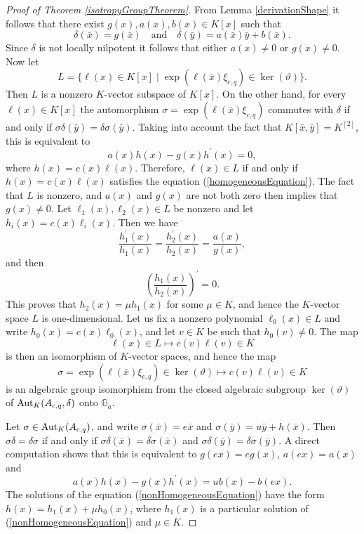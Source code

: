 \documentclass{article}
\newcommand \G {\mathbb{G}}
\renewcommand \a {A}
\renewcommand \k {K}
\newcommand \auto {{\rm Aut}}
\begin{document}
{\begin{proof}[Proof of Theorem \ref{isotropyGroupTheorem}]
	\medskip From Lemma \ref{derivationShape} it follows that there exist $g(x),a(x),b(x)\in\k[x]$ such that $$\delta(\bar{x})=g(\bar{x})\quad \mathrm{and}\quad \delta(\bar{y})=a(\bar{x})\bar{y}+b(\bar{x}).$$ Since $\delta$ is not locally nilpotent it follows that either $a(x)\neq 0$ or $g(x)\neq 0$. Now let $$L=\big\{\ell(x)\in\k[x]\mid \exp(\ell(\bar{x})\xi_{c,q})\in\ker(\vartheta) \big\}.$$ Then $L$ is a nonzero $\k$-vector subspace of $\k[x]$. On the other hand, for every $\ell(x)\in\k[x]$ the automorphism $\sigma=\exp(\ell(\bar{x})\xi_{c,q})$ commutes with $\delta$ if and only if $\sigma\delta(\bar{y})=\delta\sigma(\bar{y})$. Taking into account the fact that $\k[\bar{x},\bar{y}]=\k^{[2]}$, this is equivalent to \begin{equation}\label{homogeneousEquation}
		a(x)h(x)-g(x)h^{\prime}(x)=0,
	\end{equation}
	where $h(x)=c(x)\ell(x)$. Therefore, $\ell(x)\in L$ if and only if $h(x)=c(x)\ell(x)$ satisfies the equation (\ref{homogeneousEquation}). The fact that $L$ is nonzero, and $a(x)$ and $g(x)$ are not both zero then implies that $g(x)\neq 0$. Let $\ell_1(x),\ell_2(x)\in L$ be nonzero and let $h_i(x)=c(x)\ell_i(x)$. Then we have $$\frac{h_1^{\prime}(x)}{h_1(x)}=\frac{h_2^{\prime}(x)}{h_2(x)}=\frac{a(x)}{g(x)},$$ and then $$\left(\frac{h_1(x)}{h_2(x)}\right)^{\prime}=0.$$ This proves that $h_2(x)=\mu h_1(x)$ for some $\mu\in\k$, and hence the $\k$-vector space $L$ is one-dimensional. Let us fix a nonzero polynomial $\ell_0(x)\in L$ and write $h_0(x)=c(x)\ell_0(x)$, and let $v\in\k$ be such that $h_0(v)\neq 0$. The map $$\ell(x)\in L\longmapsto c(v)\ell(v)\in \k$$ is then an isomorphism of $\k$-vector spaces, and hence the map $$\sigma=\exp(\ell(\bar{x})\xi_{c,q})\in\ker(\vartheta)\longmapsto c(v)\ell(v)\in \k$$ is an algebraic group isomorphism from the closed algebraic subgroup $\ker(\vartheta)$ of $\auto_{\k}(\a_{c,q},\delta)$ onto $\G_a$.
	
	\medskip Let $\sigma\in\auto_{\k}(\a_{c,q})$, and write $\sigma(\bar{x})=e\bar{x}$ and $\sigma(\bar{y})=u\bar{y}+h(\bar{x})$. Then $\sigma\delta=\delta\sigma$ if and only if $\sigma\delta(\bar{x})=\delta\sigma(\bar{x})$ and $\sigma\delta(\bar{y})=\delta\sigma(\bar{y})$. A direct computation shows that this is equivalent to $g(ex)=eg(x)$, $a(ex)=a(x)$ and
	\begin{equation}\label{nonHomogeneousEquation}a(x)h(x)-g(x)h^{\prime}(x)=ub(x)-b(ex).
	\end{equation}
	The solutions of the equation (\ref{nonHomogeneousEquation}) have the form $h(x)=h_1(x)+\mu h_0(x)$, where $h_1(x)$ is a particular solution of (\ref{nonHomogeneousEquation}) and $\mu\in\k$.
	

\end{proof}}
\end{document}
